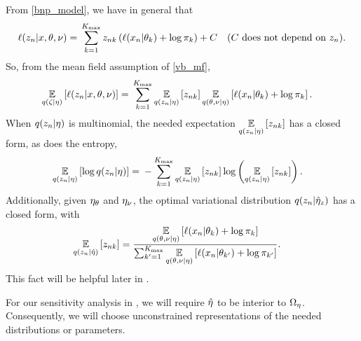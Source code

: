 \begin{ex}
%
From \eqref{bnp_model}, we have in general that
%
\begin{align*}
%
\logp(\z_n \vert \x, \theta, \nu) ={}&
\sum_{k=1}^{\kmax}
    \z_{\n\k} \left(
        \logp(\x_n \vert \theta_\k) + \log \pi_\k
    \right) + \const & \constdesc{\z_\n}.
%
\end{align*}
%
So, from the mean field assumption of \eqref{vb_mf},
%
\begin{align*}
%
\expect{\q(\zeta \vert \eta)}{\logp(\z_n \vert \x, \theta, \nu)} ={}&
\sum_{k=1}^{\kmax}
    \expect{\q(\z_\n \vert \eta)}{\z_{\n\k}}
    \expect{\q(\theta, \nu \vert \eta)}
           {\logp(\x_n \vert \theta_\k) + \log \pi_\k}.
%
\end{align*}
%
When $q(z_n \vert \eta)$ is multinomial, the needed expectation
$\underset{q(z_n \vert \eta)}{\mathbb{E}}\left[z_{nk}\right]$ has a closed form, as does the
entropy,
%
\begin{align*}
%
\expect{\q(\z_\n \vert \eta)}{\log \q(\z_\n \vert \eta)} ={}&
    - \sum_{\k=1}^{\kmax}
        \expect{\q(\z_\n \vert \eta)}{\z_{\n\k}}
        \log \left( \expect{\q(\z_\n \vert \eta)}{\z_{\n\k}} \right).
%
\end{align*}
%
Additionally, given $\eta_{\theta}$ and $\eta_{\nu}$, the optimal
variational distribution $q(z_n \vert \hat\eta_{z})$ has a closed form, with
%
\begin{align*}
%
\expect{\q(\z_\n \vert \etaopt)}{\z_{\n\k}} ={}&
\frac{
    \expect{\q(\theta, \nu \vert \eta)}
           {\logp(\x_n \vert \theta_\k) + \log \pi_\k}
}{
    \sum_{\k'=1}^{\kmax}
    \expect{\q(\theta, \nu \vert \eta)}
           {\logp(\x_n \vert \theta_{\k'}) + \log \pi_{\k'}}
}.
%
\end{align*}
%
This fact will be helpful later in .
%
\end{ex}


For our sensitivity analysis in , we will require
$\hat\eta$ to be interior to $\Omega_{\eta}$.  Consequently, we will choose
unconstrained representations of the needed distributions or parameters.


